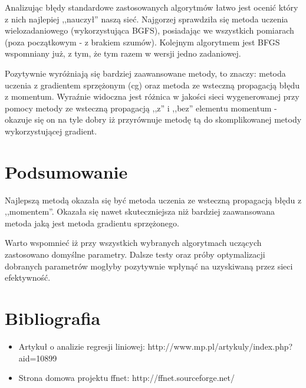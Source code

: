 \documentclass[a4paper]{article}
\begin{document}
Analizując błędy standardowe zastosowanych algorytmów łatwo jest ocenić który z nich
najlepiej ,,nauczył'' naszą sieć. Najgorzej sprawdziła się metoda uczenia wielozadaniowego (wykorzystująca BGFS),
posiadając we wszystkich pomiarach (poza początkowym - z brakiem szumów). Kolejnym algorytmem jest BFGS wspomniany już,
z tym, że tym razem w wersji jedno zadaniowej.

Pozytywnie wyróżniają się bardziej zaawansowane metody, to znaczy: metoda uczenia z gradientem sprzężonym (cg) oraz 
metoda ze wsteczną propagacją błędu z momentum. Wyraźnie widoczna jest różnica w jakości sieci wygenerowanej przy pomocy 
metody ze wsteczną propagacją ,,z'' i ,,bez'' elementu momentum - okazuje się on na tyle dobry iż przyrównuje metodę tą do 
skomplikowanej metody wykorzystującej gradient.

\newpage
\section{Podsumowanie}
Najlepszą metodą okazała się być metoda uczenia ze wsteczną propagacją błędu z ,,momentem''.
Okazała się nawet skuteczniejsza niż bardziej zaawansowana metoda jaką jest metoda gradientu sprzężonego.

Warto wspomnieć iż przy wszystkich wybranych algorytmach uczących zastosowano domyślne parametry. 
Dalsze testy oraz próby optymalizacji dobranych parametrów mogłyby pozytywnie wpłynąć na uzyskiwaną przez sieci efektywność.

\section{Bibliografia}
\begin{itemize}
 \item Artykuł o analizie regresji liniowej: http://www.mp.pl/artykuly/index.php?aid=10899
 \item Strona domowa projektu ffnet: http://ffnet.sourceforge.net/
\end{itemize}
\end{document}
